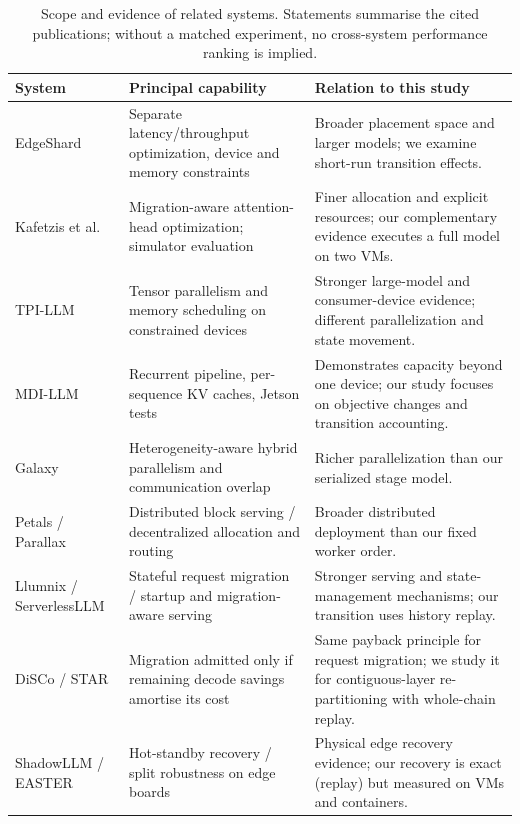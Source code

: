 \begin{table}[p]
\centering\scriptsize\setlength{\tabcolsep}{4pt}
\caption{Scope and evidence of related systems. Statements summarise the cited publications; without a matched experiment, no cross-system performance ranking is implied.}
\begin{tabular}{>{\raggedright\arraybackslash}p{.19\linewidth}>{\raggedright\arraybackslash}p{.35\linewidth}>{\raggedright\arraybackslash}p{.35\linewidth}}
\toprule System & Principal capability & Relation to this study\\\midrule
EdgeShard \cite{edgeshard2025} & Separate latency/throughput optimization, device and memory constraints & Broader placement space and larger models; we examine short-run transition effects.\\
Kafetzis et al. \cite{kafetzis2025partitioning} & Migration-aware attention-head optimization; simulator evaluation & Finer allocation and explicit resources; our complementary evidence executes a full model on two VMs.\\
TPI-LLM \cite{tpi2025} & Tensor parallelism and memory scheduling on constrained devices & Stronger large-model and consumer-device evidence; different parallelization and state movement.\\
MDI-LLM \cite{mdi2025} & Recurrent pipeline, per-sequence KV caches, Jetson tests & Demonstrates capacity beyond one device; our study focuses on objective changes and transition accounting.\\
Galaxy \cite{galaxy2024} & Heterogeneity-aware hybrid parallelism and communication overlap & Richer parallelization than our serialized stage model.\\
Petals / Parallax \cite{borzunov2023petals,tong2025parallax} & Distributed block serving / decentralized allocation and routing & Broader distributed deployment than our fixed worker order.\\
Llumnix / ServerlessLLM \cite{sun2024llumnix,fu2024serverlessllm} & Stateful request migration / startup and migration-aware serving & Stronger serving and state-management mechanisms; our transition uses history replay.\\
DiSCo / STAR \cite{sun-etal-2025-disco,star2026} & Migration admitted only if remaining decode savings amortise its cost & Same payback principle for request migration; we study it for contiguous-layer re-partitioning with whole-chain replay.\\
ShadowLLM / EASTER \cite{chen2026shadowllmhotstandby,easter2024} & Hot-standby recovery / split robustness on edge boards & Physical edge recovery evidence; our recovery is exact (replay) but measured on VMs and containers.\\

\end{tabular}
\end{table}
